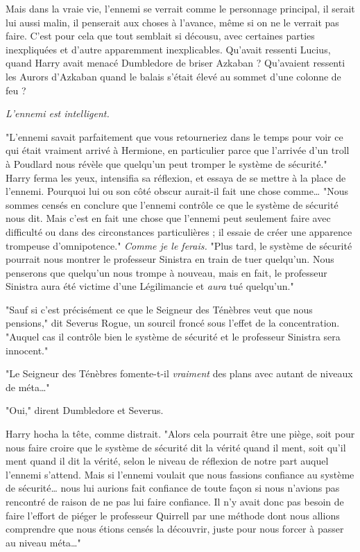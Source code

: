 Mais dans la vraie vie, l'ennemi se verrait comme le personnage principal, il serait lui aussi malin, il penserait aux choses à l'avance, même si on ne le verrait pas faire. C'est pour cela que tout semblait si décousu, avec certaines parties inexpliquées et d'autre apparemment inexplicables. Qu'avait ressenti Lucius, quand Harry avait menacé Dumbledore de briser Azkaban ? Qu'avaient ressenti les Aurors d'Azkaban quand le balais s'était élevé au sommet d'une colonne de feu ?

\emph{L'ennemi est intelligent.} 

"L'ennemi savait parfaitement que vous retourneriez dans le temps pour voir ce qui était vraiment arrivé à Hermione, en particulier parce que l'arrivée d'un troll à Poudlard nous révèle que quelqu'un peut tromper le système de sécurité." Harry ferma les yeux, intensifia sa réflexion, et essaya de se mettre à la place de l'ennemi. Pourquoi lui ou son côté obscur aurait-il fait une chose comme… "Nous sommes censés en conclure que l'ennemi contrôle ce que le système de sécurité nous dit. Mais c'est en fait une chose que l'ennemi peut seulement faire avec difficulté ou dans des circonstances particulières ; il essaie de créer une apparence trompeuse d'omnipotence." \emph{Comme je le ferais.}  "Plus tard, le système de sécurité pourrait nous montrer le professeur Sinistra en train de tuer quelqu'un. Nous penserons que quelqu'un nous trompe à nouveau, mais en fait, le professeur Sinistra aura été victime d'une Légilimancie et \emph{aura}  tué quelqu'un."

"Sauf si c'est précisément ce que le Seigneur des Ténèbres veut que nous pensions," dit Severus Rogue, un sourcil froncé sous l'effet de la concentration. "Auquel cas il contrôle bien le système de sécurité et le professeur Sinistra sera innocent."

"Le Seigneur des Ténèbres fomente-t-il \emph{vraiment}  des plans avec autant de niveaux de méta…"

"Oui," dirent Dumbledore et Severus.

Harry hocha la tête, comme distrait. "Alors cela pourrait être une piège, soit pour nous faire croire que le système de sécurité dit la vérité quand il ment, soit qu'il ment quand il dit la vérité, selon le niveau de réflexion de notre part auquel l'ennemi s'attend. Mais si l'ennemi voulait que nous fassions confiance au système de sécurité… nous lui aurions fait confiance de toute façon si nous n'avions pas rencontré de raison de ne pas lui faire confiance. Il n'y avait donc pas besoin de faire l'effort de piéger le professeur Quirrell par une méthode dont nous allions comprendre que nous étions censés la découvrir, juste pour nous forcer à passer au niveau méta…"

